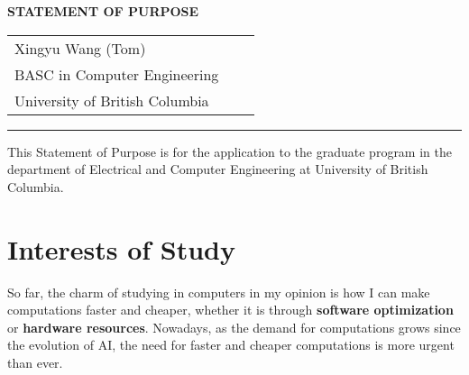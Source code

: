 \documentclass[a4 paper, 10pt]{article}
\begin{document}
\newcommand{\ifstringequal}[4]{%
	\ifnum\pdfstrcmp{#1}{#2}=0
	#3%
	\else
	#4%
	\fi
}

\newcommand{\theSchoolFullName}{University of British Columbia}
\newcommand{\theDepartment}{the department of Electrical and Computer Engineering}

\pagestyle{empty} %

{\selectfont %

	\begin{center}
		\begin{minipage}{.9\textwidth}
			\Large{\textbf{STATEMENT OF PURPOSE}}
		\end{minipage}

		\begin{tabularx}{.8\textwidth}{X r X}
			Xingyu Wang (Tom)                                                               \\
			BASC in Computer Engineering            \\
			University of British Columbia 
		\end{tabularx}
		\par\noindent\rule{\textwidth}{1.25pt}
	\end{center}

}

\selectfont %

This Statement of Purpose is for the application to the graduate program in \theDepartment{} at \theSchoolFullName{}.

\section*{Interests of Study}
So far, the charm of studying in computers in my opinion is how I can make computations {faster and cheaper}, whether it is through \textbf{software optimization} or \textbf{hardware resources}. Nowadays, as the demand for computations grows since the evolution of {AI}, the need for {faster and cheaper computations} is more urgent than ever.
\end{document}
